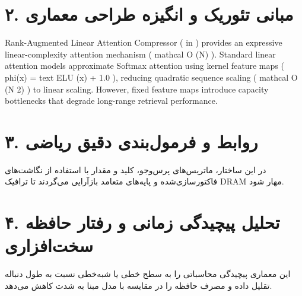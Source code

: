 \documentclass[12pt,a4paper]{article}
\begin{document}
\section*{۲. مبانی تئوریک و انگیزه طراحی معماری}
Rank-Augmented Linear Attention Compressor ( in ) provides an expressive linear-complexity attention mechanism ( mathcal O (N) ). Standard linear attention models approximate Softmax attention using kernel feature maps ( phi(x) = text ELU (x) + 1.0 ), reducing quadratic sequence scaling ( mathcal O (N 2) ) to linear scaling. However, fixed feature maps introduce capacity bottlenecks that degrade long-range retrieval performance.

\section*{۳. روابط و فرمول‌بندی دقیق ریاضی}
در این ساختار، ماتریس‌های پرس‌وجو، کلید و مقدار با استفاده از نگاشت‌های فاکتورسازی‌شده و پایه‌های متعامد بازآرایی می‌گردند تا ترافیک DRAM مهار شود.

\section*{۴. تحلیل پیچیدگی زمانی و رفتار حافظه سخت‌افزاری}
این معماری پیچیدگی محاسباتی را به سطح خطی یا شبه‌خطی نسبت به طول دنباله تقلیل داده و مصرف حافظه را در مقایسه با مدل مبنا به شدت کاهش می‌دهد.
\end{document}
